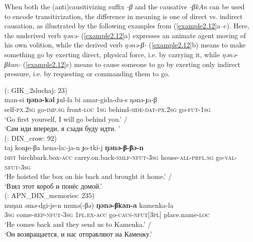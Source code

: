 \documentclass[output=paper,colorlinks,citecolor=brown]{langscibook}
\begin{document}
When both the (anti)causitivizing suffix \textit{-β} and the causative \textit{-βkAn} can be used to encode transitivization, the difference in meaning is one of direct vs. indirect causation, as illustrated by the following examples from  (\ref{example2.12}a--c). Here, the underived verb \textit{ŋənə-} (\ref{example2.12}a) expresses an animate agent moving of his own volition, while the derived verb \textit{ŋənə-β-} (\ref{example2.12}b) means to make something go by exerting direct, physical force, i.e. by carrying it, while \textit{ŋənə-βkan-} (\ref{example2.12}c) means to cause someone to go by exerting only indirect pressure, i.e. by requesting or commanding them to go.

\ea
    \label{example2.12}
    \ea
     (\citealt{Pakendorf2017}: GIK\_2sluchaj: 23)\\
    \gll man-si	\textbf{ŋənə-kəl}	ɟul-la	bi	amar-gida-du-s	ŋənə-ɟa-β\\
    self-\textsc{px.2sg}	go-\textsc{imp.sg}	front-\textsc{loc}	1\textsc{sg}	behind-\textsc{side-dat-px.2sg}	go-\textsc{fut-1sg}\\
    \glt ‘Go first yourself, I will go behind you.’ /\\‘Сам иди впереди, я сзади буду идти. ’\\

\ex
     (\citealt{Pakendorf2017}: DIN\_crow: 92)\\
    \gll taj	konɟe-βa	hena-laː-ja-n	ɟo-tki-j    \textbf{ŋənə-β-βə-n}\\
    \textsc{dist}	birchbark.box-\textsc{acc}	carry.on.back-\textsc{smlf-nfut-3sg}	house-\textsc{all-prfl.sg} go-\textsc{val-nfut-3sg}\\
    \glt ‘‎‎He hoisted the box on his back and brought it home.’ /\\‘‎‎Взял этот короб и понёс домой.’\\

\ex
     (\citealt{Pakendorf2017}: APN\_DIN\_memories: 235)\\
    \gll nuŋan	əmə-dgi-je-n	munə(-βə)	\textbf{ŋənə-βkan-a}	kamenka-la\\
    3\textsc{sg}	come-\textsc{rep-nfut-3sg}	1\textsc{pl.ex-acc}	go-\textsc{caus-nfut[3pl]}	place.name-\textsc{loc}\\
    \glt ‘He comes back and they send us to Kamenka.’ /\\‘Он возвращается, и нас отправляют на Каменку.’\\
    \z
\z
\end{document}
